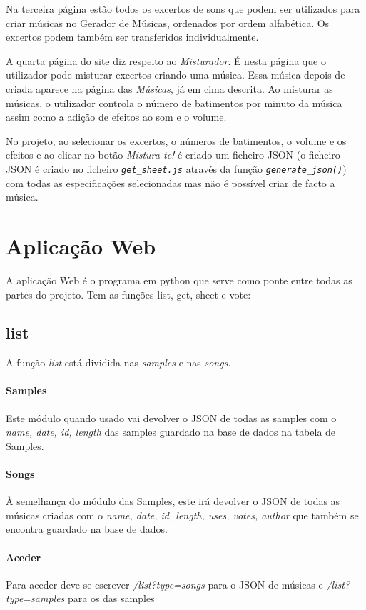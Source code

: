 \documentclass{report}
\begin{document}
Na terceira página estão todos os excertos de sons que podem ser utilizados para criar músicas no Gerador de Músicas, ordenados por ordem alfabética. Os excertos podem também ser transferidos individualmente.

A quarta página do site diz respeito ao \textit{Misturador}. É nesta página que o utilizador pode misturar excertos criando uma música. Essa música depois de criada aparece na página das \textit{Músicas}, já em cima descrita. 
Ao misturar as músicas, o utilizador controla o número de batimentos por minuto da música assim como a adição de efeitos ao som e o volume.

No projeto, ao selecionar os excertos, o números de batimentos, o volume e os efeitos e ao clicar no botão \textit{Mistura-te!} é criado um ficheiro JSON (o ficheiro JSON é criado no ficheiro \textit{\texttt{get\_sheet.js}} através da função \textit{\texttt{generate\_json()}}) com todas as especificações selecionadas mas não é possível criar de facto a música. 


\section{Aplicação Web}
\label{chap.aplicacao}
A aplicação Web é o programa em python que serve como ponte entre todas as partes do projeto.
Tem as funções list, get, sheet e vote:

\subsection{list}
A função \textit{list} está dividida nas \textit{samples} e nas \textit{songs}.
\paragraph{Samples}
Este módulo quando usado vai devolver o JSON de todas as samples com o 
\textit{name, date, id, length} das samples guardado na base de dados na tabela de Samples.
\paragraph{Songs}
À semelhança do módulo das Samples, este irá devolver o JSON de todas 
as músicas criadas com o \textit{name, date, id, length, uses, votes, author}
 que também se encontra guardado na base de dados.
 \paragraph{Aceder}
	Para aceder deve-se escrever \textit{/list?type=songs} para o JSON de músicas e \textit{/list?type=samples}
 para os das samples
\end{document}
